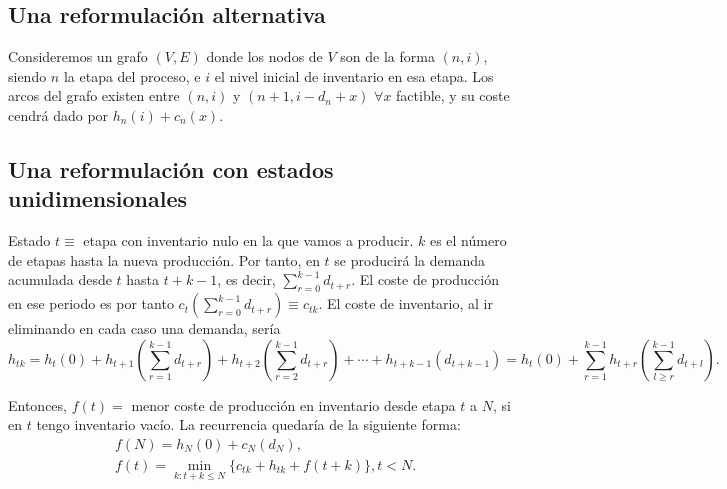 \documentclass[MIOP.tex]{subfiles}
\begin{document}
\subsection{Una reformulación alternativa}
Consideremos un grafo $(V,E)$ donde los nodos de $V$ son de la forma $(n,i)$, siendo $n$ la etapa del proceso, e $i$ el nivel inicial de inventario en esa etapa. Los arcos del grafo existen entre $(n,i)$ y $(n+1,i-d_n+x)$ $\forall x$ factible, y su coste cendrá dado por $h_n(i)+c_n(x)$. 

\subsection{Una reformulación con estados unidimensionales}
Estado $t\equiv$ etapa con inventario nulo en la que vamos a producir. $k$ es el número de etapas hasta la nueva producción. Por tanto, en $t$ se producirá la demanda acumulada desde $t$ hasta $t+k-1$, es decir, $\sum_{r=0}^{k-1}d_{t+r}$. El coste de producción en ese periodo es por tanto $c_t(\sum_{r=0}^{k-1}d_{t+r})\equiv c_{tk}$. El coste de inventario, al ir eliminando en cada caso una demanda,  sería 
$$h_{tk}=h_t(0)+h_{t+1}\left(\sum_{r=1}^{k-1}d_{t+r}\right)+h_{t+2}\left(\sum_{r=2}^{k-1}d_{t+r}\right)+\cdots +h_{t+k-1}(d_{t+k-1})=h_t(0)+\sum_{r=1}^{k-1}h_{t+r}\left(\sum_{l\geq r}^{k-1}d_{t+l}\right).$$

Entonces,  $f(t)=$ menor coste de producción en inventario desde etapa $t$ a $N$, si en $t$ tengo inventario vacío. La recurrencia quedaría de la siguiente forma:
\begin{align*}
&f(N)=h_N(0)+c_N(d_N),\\
&f(t)=\min_{k:t+k\leq N}\{c_{tk}+h_{tk}+f(t+k)\}, t<N.
\end{align*}
\end{document}
